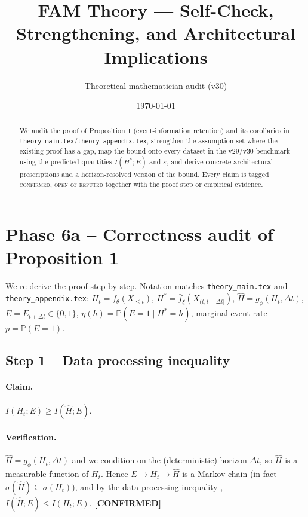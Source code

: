 \documentclass[11pt]{article}
\title{FAM Theory --- Self-Check, Strengthening, and Architectural Implications}
\author{Theoretical-mathematician audit (v30)}
\date{\today}
\newcommand{\PP}{\mathbb{P}}
\newcommand{\encoder}{f_\theta}
\newcommand{\predictor}{g_\phi}
\newcommand{\target}{\bar f_\xi}
\newcommand{\CONF}{{\color{black!60!green}\textbf{[CONFIRMED]}}}
\begin{document}
\maketitle

\begin{abstract}
We audit the proof of Proposition 1 (event-information retention) and its
corollaries in \texttt{theory\_main.tex}/\texttt{theory\_appendix.tex},
strengthen the assumption set where the existing proof has a gap, map the
bound onto every dataset in the v29/v30 benchmark using the predicted
quantities $I(H^*;E)$ and $\varepsilon$, and derive concrete architectural
prescriptions and a horizon-resolved version of the bound. Every claim is
tagged \textsc{confirmed}, \textsc{open} or \textsc{refuted} together with
the proof step or empirical evidence.
\end{abstract}

\tableofcontents

\section{Phase 6a -- Correctness audit of Proposition 1}
\label{sec:phase6a}

We re-derive the proof step by step. Notation matches \texttt{theory\_main.tex}
and \texttt{theory\_appendix.tex}: $H_t=\encoder(X_{\le t})$,
$H^*=\target(X_{(t,t+\Delta t]})$, $\hat H=\predictor(H_t,\Delta t)$,
$E=E_{t+\Delta t}\in\{0,1\}$, $\eta(h)=\PP(E=1\mid H^*=h)$, marginal
event rate $p=\PP(E=1)$.

\subsection{Step 1 -- Data processing inequality}

\paragraph{Claim.} $I(H_t;E)\ge I(\hat H;E)$.

\paragraph{Verification.}
$\hat H=\predictor(H_t,\Delta t)$ and we condition on the (deterministic)
horizon $\Delta t$, so $\hat H$ is a measurable function of $H_t$. Hence
$E\to H_t\to \hat H$ is a Markov chain (in fact $\sigma(\hat H)\subseteq
\sigma(H_t)$), and by the data processing inequality
\citep[Thm.~2.8.1]{cover2006elements}, $I(\hat H;E)\le I(H_t;E)$. \CONF
\end{document}
